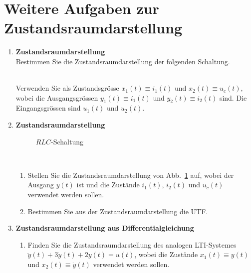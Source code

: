 {\newpage
\section{Weitere Aufgaben zur Zustandsraumdarstellung}
\begin{enumerate}
\item {\bf Zustandsraumdarstellung \cite{HSU:95}}\\
  Bestimmen Sie die Zustandsraumdarstellung der folgenden Schaltung.\\
\begin{figure}[!htb]
\vspace*{-4mm}\begin{center}
\end{center}
\vspace*{-6mm}
\end{figure}\\
Verwenden Sie als Zustandsgr\"osse $x_1(t)\equiv i_1(t)$ und
$x_2(t)\equiv u_c(t)$, wobei die Ausgangsgr\"ossen $y_1(t)\equiv
i_1(t)$ und $y_2(t)\equiv i_2(t)$ sind. Die Eingangsgr\"ossen sind $u_1(t)$ und $u_2(t)$.
\item {\bf Zustandsraumdarstellung \cite{GIR:RAB:STE:05}}
\\
\begin{figure}[!htb]
\vspace*{-4mm}\begin{center}
  \caption{$RLC$-Schaltung}\label{ZRD_FIG_06}
\end{center}
\vspace*{-14mm}
\end{figure}\\
\begin{enumerate}
\item Stellen Sie die Zustandsraumdarstellung von
  Abb.~\ref{ZRD_FIG_06} auf, wobei der Ausgang $y(t)$ ist und die
  Zust\"ande $i_1(t)$, $i_2(t)$ und $u_c(t)$ verwendet werden sollen.
 \item Bestimmen Sie aus der Zustandsraumdarstellung die UTF.
\end{enumerate}
\item {\bf Zustandsraumdarstellung aus Differentialgleichung \cite{HSU:95}}
\begin{enumerate}
\item Finden Sie die Zustandsraumdarstellung des analogen LTI-Systemes
  $\ddot{y}(t)+3\dot{y}(t)+2y(t)=u(t)$, wobei die Zust\"ande
  $x_1(t)\equiv y(t)$ und $x_2(t)\equiv \dot{y}(t)$ verwendet werden
  sollen.

\end{enumerate}
\end{enumerate}}
